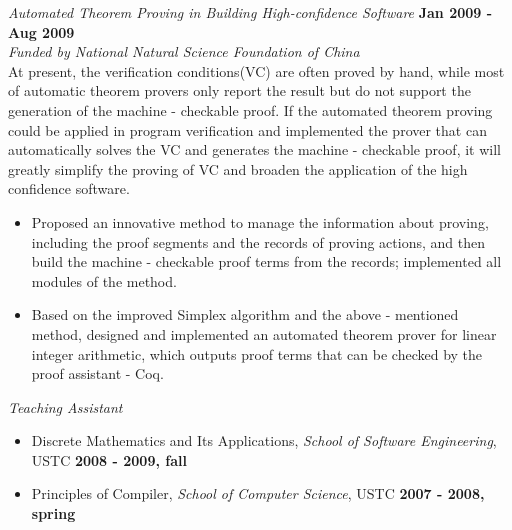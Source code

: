 \documentclass[margin]{res}
\begin{document}
{\em\large Automated Theorem Proving in Building High-confidence Software} \hfill \textbf{Jan 2009 - Aug 2009}\\
\hspace*{\fill} {\em Funded by National Natural Science Foundation of China}\\
At present, the verification conditions(VC) are often proved by hand, while most of automatic theorem provers only report the result but do not support the generation of the machine - checkable proof. If the automated theorem proving could be applied in program verification and implemented the prover that can automatically solves the VC and generates the machine - checkable proof, it will greatly simplify the proving of VC and broaden the application of the high confidence software.
\\[-2.5mm]
\begin{itemize}
\item Proposed an innovative method to manage the information about proving, including the proof segments and the records of proving actions, and then build the machine - checkable proof terms from the records; implemented all modules of the method.

\item Based on the improved Simplex algorithm and the above - mentioned method, designed and implemented an automated theorem prover for linear integer arithmetic, which outputs proof terms that can be checked by the proof assistant - Coq.
\end{itemize}
\vspace{1mm}

{\em Teaching Assistant}
\vspace{1mm}
\begin{itemize}
\item Discrete Mathematics and Its Applications, {\em School of Software Engineering}, USTC  \hfill {\bf 2008 - 2009, fall}

\item Principles of Compiler, {\em School of Computer Science}, USTC  \hfill {\bf 2007 - 2008, spring}
\end{itemize}
\vspace{2mm}

\end{document}
